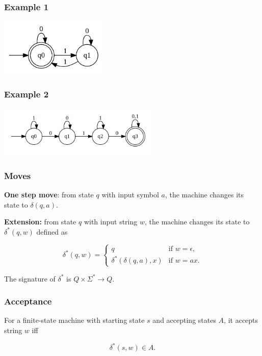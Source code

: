 \begin{frame}
  \frametitle{Example 1}

  \includegraphics[width=2in]{images/gv/mc02-fa-ex1.png}
\end{frame}

\begin{frame}
  \frametitle{Example 2}

  \includegraphics[width=3in]{images/gv/mc02-fa-ex2.png}
\end{frame}

\begin{frame}
  \frametitle{Moves}

  {\bf One step move}: from state $q$ with input symbol $a$, the
  machine changes its state to \pause $\delta(q,a)$.

  {\bf Extension:} from state $q$ with input string $w$, the machine
  changes its state to $\delta^*(q,w)$ defined as

  \pause

  \begin{block}{}
  \[
  \delta^*(q,w) = \left\{
  \begin{array}{ll}
    q & \mbox{if $w=\epsilon$,} \\
    \delta^*(\delta(q,a),x) & \mbox{if $w=ax$.}
  \end{array}
  \right.
  \]
  \end{block}
  
  The signature of $\delta^*$ is $Q\times\Sigma^* \longrightarrow Q$.
\end{frame}

\begin{frame}
  \frametitle{Acceptance}

  For a finite-state machine with starting state $s$ and accepting
  states $A$, it accepts string $w$ iff

  \pause

  \[
  \delta^*(s,w)\in A.
  \]
  
\end{frame}

